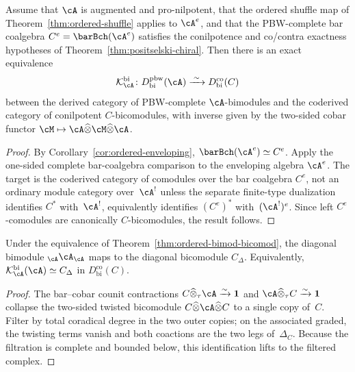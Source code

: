 \begin{theorem}
\label{thm:ordered-bimod-bicomod}
Assume that $\cA$ is augmented and pro-nilpotent, that the ordered
shuffle map of Theorem~\textup{\ref{thm:ordered-shuffle}} applies to
$\cA^e$, and that the PBW-complete bar coalgebra
$C^e=\barBch(\cA^e)$ satisfies the conilpotence and
co/contra exactness hypotheses of
Theorem~\textup{\ref{thm:positselski-chiral}}.  Then there is an
exact equivalence
\[
 \mathcal{K}_\cA^{\mathrm{bi}} \colon
 D^{\mathrm{pbw}}_{\mathrm{bi}}(\cA)
 \xrightarrow{\;\sim\;}
 D^{\mathrm{co}}_{\mathrm{bi}}(C)
\]
between the derived category of PBW-complete $\cA$-bimodules and
the coderived category of conilpotent $C$-bicomodules, with inverse
given by the two-sided cobar functor
$\cM \mapsto \cA \widehat\otimes \cM \widehat\otimes \cA$.
\end{theorem}

\begin{proof}
By Corollary~\ref{cor:ordered-enveloping},
$\barBch(\cA^e) \simeq C^e$.
Apply the one-sided complete bar-coalgebra comparison to the
enveloping algebra $\cA^e$.  The target is the coderived category of
comodules over the bar coalgebra $C^e$, not an ordinary module
category over~$\cA^!$ unless the separate finite-type dualization
identifies $C^*$ with~$\cA^!$, equivalently identifies
$(C^e)^*$ with~$(\cA^!)^e$. Since left $C^e$-comodules are
canonically $C$-bicomodules, the result follows.
\end{proof}

\begin{theorem}
\label{thm:ordered-diagonal}
Under the equivalence of
Theorem~\textup{\ref{thm:ordered-bimod-bicomod}}, the diagonal
bimodule ${}_\cA \cA_\cA$ maps to the diagonal bicomodule
$C_\Delta$. Equivalently,
$\mathcal{K}_\cA^{\mathrm{bi}}(\cA) \simeq C_\Delta$ in
$D^{\mathrm{co}}_{\mathrm{bi}}(C)$.
\end{theorem}

\begin{proof}
The bar--cobar counit contractions
$C \widehat\otimes_\tau \cA \xrightarrow{\sim} \mathbf{1}$ and
$\cA \widehat\otimes_\tau C \xrightarrow{\sim} \mathbf{1}$
collapse the two-sided twisted bicomodule
$C \widehat\otimes \cA \widehat\otimes C$ to a single copy of~$C$.
Filter by total coradical degree in the two outer copies; on the
associated graded, the twisting terms vanish and both coactions are
the two legs of~$\Delta_C$. Because the filtration is complete and
bounded below, this identification lifts to the filtered complex.
\end{proof}

